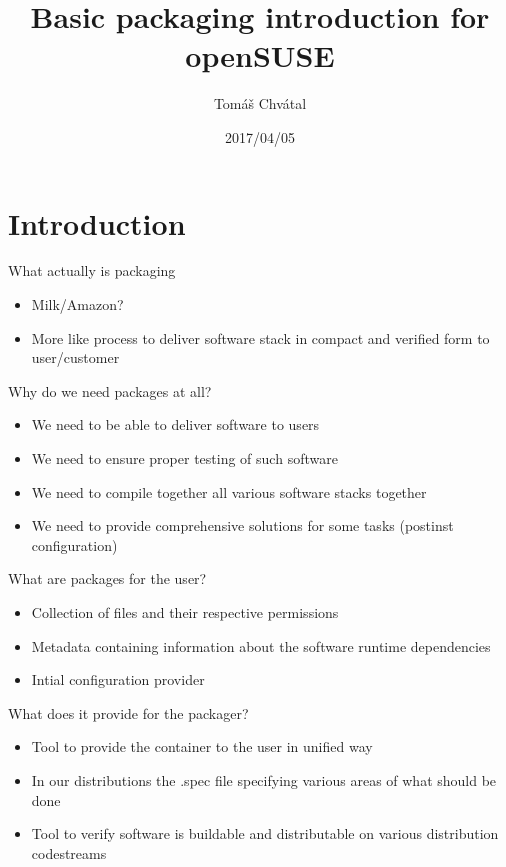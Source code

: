 \documentclass{beamer}
\author{Tom\'{a}\v{s} Chv\'{a}tal\newline {\small tchvatal@suse.com}\newline {\small Packaging/L3 - Packaging}}
\title{Basic packaging introduction for openSUSE}
\date{2017/04/05}
\begin{document}
\begin{frame}[t,plain]
\titlepage
\end{frame}

\section{Introduction}

\begin{frame}[t]{What actually is packaging}
	\begin{itemize}
	\item Milk/Amazon?
	\item More like process to deliver software stack in compact and verified form to user/customer
	\end{itemize}
\end{frame}

\begin{frame}[t]{Why do we need packages at all?}
	\begin{itemize}
	\item We need to be able to deliver software to users
	\item We need to ensure proper testing of such software
	\item We need to compile together all various software stacks together
	\item We need to provide comprehensive solutions for some tasks (postinst configuration)
	\end{itemize}
\end{frame}

\begin{frame}[t]{What are packages for the user?}
	\begin{itemize}
	\item Collection of files and their respective permissions
	\item Metadata containing information about the software runtime dependencies
	\item Intial configuration provider
	\end{itemize}
\end{frame}


\begin{frame}[t]{What does it provide for the packager?}
	\begin{itemize}
	\item Tool to provide the container to the user in unified way
	\item In our distributions the .spec file specifying various areas of what should be done
	\item Tool to verify software is buildable and distributable on various distribution codestreams
	\end{itemize}
\end{frame}
\end{document}
